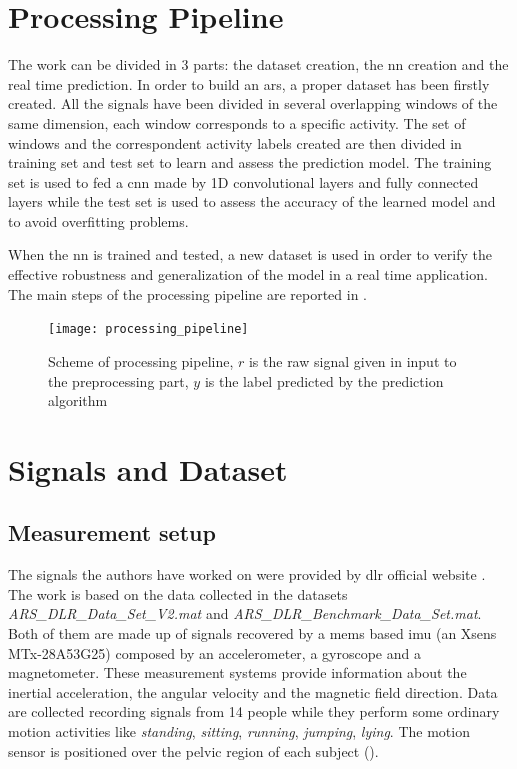 
\section{Processing Pipeline}
\label{sec:processing_architecture}
The work can be divided in 3 parts: the dataset creation, the \gls{nn} creation and the real time prediction.
In order to build an \gls{ars}, a proper dataset has been firstly created. All the signals have been divided in several overlapping windows of the same dimension, each window corresponds to a specific activity. The set of windows and the correspondent activity labels created are then divided in training set and test set to learn and assess the prediction model.
The training set is used to fed a \gls{cnn} made by 1D convolutional layers and fully connected layers while the test set is used to assess the accuracy of the learned model and to avoid overfitting problems.

When the \gls{nn} is trained and tested, a new dataset is used in order to verify the effective robustness and generalization of the model in a real time application.
The main steps of the processing pipeline are reported in .

\begin{figure}[htp]
\texttt{[image: processing\_pipeline]}
\caption{Scheme of processing pipeline, $r$ is the raw signal given in input to the preprocessing part, $y$ is the label predicted by the prediction algorithm}
\label{fig:processing_pipeline}
\end{figure}


\section{Signals and Dataset}
\label{sec:model}

\subsection{Measurement setup}
The signals the authors have worked on were provided by \gls{dlr} official website \cite{DLR}. The work is based on the data collected in the datasets \textit{ARS\_DLR\_Data\_Set\_V2.mat} and \textit{ARS\_DLR\_Benchmark\_Data\_Set.mat}.
Both of them are made up of signals recovered by a \gls{mems} based \gls{imu} (an Xsens MTx-28A53G25) composed by an accelerometer, a gyroscope and a magnetometer. These measurement systems provide information about the inertial acceleration, the angular velocity and the magnetic field direction.
Data are collected recording signals from 14 people while they perform some ordinary motion activities like \textit{standing}, \textit{sitting}, \textit{running}, \textit{jumping}, \textit{lying}. The motion sensor is positioned over the pelvic region of each subject ().

